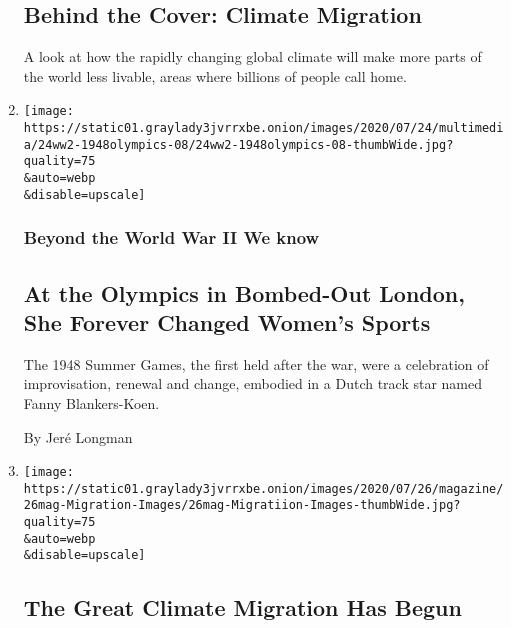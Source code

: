 \begin{enumerate}
  \hypertarget{behind-the-cover-climate-migration}{%
  \subsection{Behind the Cover: Climate
  Migration}\label{behind-the-cover-climate-migration}}

  A look at how the rapidly changing global climate will make more parts
  of the world less livable, areas where billions of people call home.
\item
  \href{/2020/07/24/magazine/1948-olympics-fanny-blankers-koen.html}{}

  \texttt{[image: https://static01.graylady3jvrrxbe.onion/images/2020/07/24/multimedia/24ww2-1948olympics-08/24ww2-1948olympics-08-thumbWide.jpg?quality=75\\\&auto=webp\\\&disable=upscale]}

  \hypertarget{beyond-the-world-war-ii-we-know-1}{%
  \subsubsection{Beyond the World War II We
  know}\label{beyond-the-world-war-ii-we-know-1}}

  \hypertarget{at-the-olympics-in-bombed-out-london-she-forever-changed-womens-sports}{%
  \subsection{At the Olympics in Bombed-Out London, She Forever Changed
  Women's
  Sports}\label{at-the-olympics-in-bombed-out-london-she-forever-changed-womens-sports}}

  The 1948 Summer Games, the first held after the war, were a
  celebration of improvisation, renewal and change, embodied in a Dutch
  track star named Fanny Blankers-Koen.

  By Jeré Longman
\item
  \href{/interactive/2020/07/23/magazine/climate-migration.html}{}

  \texttt{[image: https://static01.graylady3jvrrxbe.onion/images/2020/07/26/magazine/26mag-Migration-Images/26mag-Migratiion-Images-thumbWide.jpg?quality=75\\\&auto=webp\\\&disable=upscale]}

  \hypertarget{the-great-climate-migration-has-begun}{%
  \subsection{The Great Climate Migration Has
  Begun}\label{the-great-climate-migration-has-begun}}


\end{enumerate}
